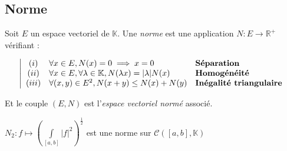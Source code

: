 \documentclass[11pt,a4paper,fleqn,pdftex]{report}
\begin{document}
\subsection{Norme}
\begin{dfn}
Soit $E$ un espace vectoriel de
$\mathbb{K}$. Une \emph{norme} 
est une application $N : E \to \mathbb{R}^+$ vérifiant : 

\begin{equation}
\left| 
\begin{array}{c l l}
(i)&\forall x \in E, N(x)=0 \implies x=0 &\textbf{Séparation}\\
(ii)&\forall x \in E, \forall \lambda \in \mathbb{K}, N(\lambda x)=|\lambda|N(x) &\textbf{Homogénéité}\\
(iii)&\forall (x,y) \in E^2, N(x+y)\le N(x)+N(y)&\textbf{Inégalité triangulaire}\\
\end{array}
\right.
\end{equation}

Et le couple $(E,N)$ est l'\emph{espace
vectoriel normé} associé.
\end{dfn}
\begin{theorem}
$N_2 : f \mapsto \left( \int \limits_{[a,b]} |f|^2 \right)^{\frac{1}{2}}$ est une norme sur $\mathcal{C}\left( [a,b], \mathbb{K} \right)$
\end{theorem}
\end{document}
